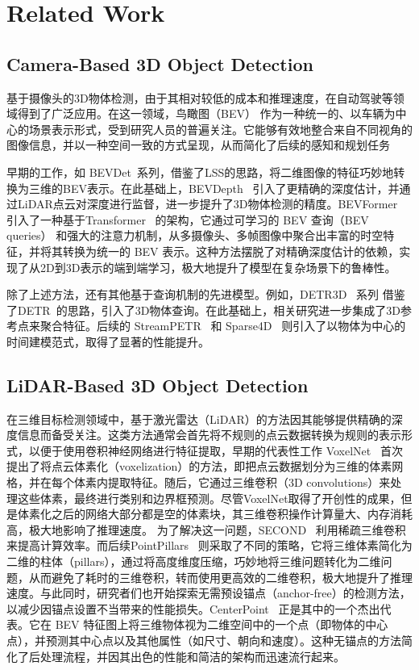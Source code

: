 \documentclass[12pt, UTF8]{ctexart}
\begin{document}
\section{Related Work}
\subsection{Camera-Based 3D Object Detection}

基于摄像头的3D物体检测，由于其相对较低的成本和推理速度，在自动驾驶等领域得到了广泛应用。在这一领域，鸟瞰图（BEV） 作为一种统一的、以车辆为中心的场景表示形式，受到研究人员的普遍关注。它能够有效地整合来自不同视角的图像信息，并以一种空间一致的方式呈现，从而简化了后续的感知和规划任务

早期的工作，如 BEVDet~\cite{bevdet}系列，借鉴了LSS\cite{philion2020lift}的思路，将二维图像的特征巧妙地转换为三维的BEV表示。在此基础上，BEVDepth~\cite{bevdepth} 引入了更精确的深度估计，并通过LiDAR点云对深度进行监督，进一步提升了3D物体检测的精度。BEVFormer~\cite{bevformer} 引入了一种基于Transformer~\cite{attention} 的架构，它通过可学习的 BEV 查询（BEV queries） 和强大的注意力机制，从多摄像头、多帧图像中聚合出丰富的时空特征，并将其转换为统一的 BEV 表示。这种方法摆脱了对精确深度估计的依赖，实现了从2D到3D表示的端到端学习，极大地提升了模型在复杂场景下的鲁棒性。

除了上述方法，还有其他基于查询机制的先进模型。例如，DETR3D~\cite{detr3d} 系列 借鉴了DETR~\cite{deformable}的思路，引入了3D物体查询。在此基础上，相关研究进一步集成了3D参考点来聚合特征。后续的 StreamPETR~\cite{streampetr} 和 Sparse4D~\cite{sparse4d} 则引入了以物体为中心的时间建模范式，取得了显著的性能提升。

\subsection{LiDAR-Based 3D Object Detection}
在三维目标检测领域中，基于激光雷达（LiDAR）的方法因其能够提供精确的深度信息而备受关注。这类方法通常会首先将不规则的点云数据转换为规则的表示形式，以便于使用卷积神经网络进行特征提取，早期的代表性工作 VoxelNet~\cite{voxelnet} 首次提出了将点云体素化（voxelization）的方法，即把点云数据划分为三维的体素网格，并在每个体素内提取特征。随后，它通过三维卷积（3D convolutions）来处理这些体素，最终进行类别和边界框预测。尽管VoxelNet取得了开创性的成果，但是体素化之后的网络大部分都是空的体素块，其三维卷积操作计算量大、内存消耗高，极大地影响了推理速度。
为了解决这一问题，SECOND~\cite{second} 利用稀疏三维卷积来提高计算效率。而后续PointPillars~\cite{pointpillars} 则采取了不同的策略，它将三维体素简化为二维的柱体（pillars），通过将高度维度压缩，巧妙地将三维问题转化为二维问题，从而避免了耗时的三维卷积，转而使用更高效的二维卷积，极大地提升了推理速度。与此同时，研究者们也开始探索无需预设锚点（anchor-free）的检测方法，以减少因锚点设置不当带来的性能损失。CenterPoint~\cite{centerpoint} 正是其中的一个杰出代表。它在 BEV 特征图上将三维物体视为二维空间中的一个点（即物体的中心点），并预测其中心点以及其他属性（如尺寸、朝向和速度）。这种无锚点的方法简化了后处理流程，并因其出色的性能和简洁的架构而迅速流行起来。
\end{document}
